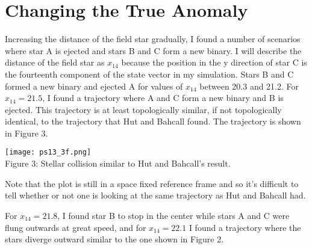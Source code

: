\documentclass[12pt, letterpaper]{article}
\begin{document}
\section*{Changing the True Anomaly}

Increasing the distance of the field star gradually, I found a number of
scenarios where star A is ejected and stars B and C form a new binary. I will
describe the distance of the field star as $x_{14}$ because the position in the
y direction of star C is the fourteenth component of the state vector in my
simulation. Stars B and C formed a new binary and ejected A for values of
$x_{14}$ between 20.3 and 21.2. For $x_{14} = 21.5$, I found a trajectory where
A and C form a new binary and B is ejected. This trajectory is at least
topologically similar, if not topologically identical, to the trajectory that
Hut and Bahcall found. The trajectory is shown in Figure 3.

\begin{center}
\texttt{[image: ps13\_3f.png]}
\\
Figure 3: Stellar collision similar to Hut and Bahcall's result.
\end{center}

Note that the plot is still in a space fixed reference frame and so it's
difficult to tell whether or not one is looking at the same trajectory as Hut
and Bahcall had.

For $x_{14} = 21.8$, I found star B to stop in the center while stars A and C
were flung outwards at great speed, and for $x_{14} = 22.1$ I found a trajectory
where the stars diverge outward similar to the one shown in Figure 2.
\end{document}
